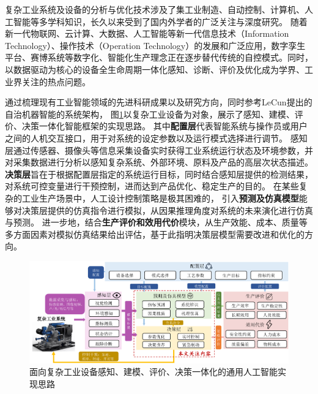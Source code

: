 

复杂工业系统及设备的分析与优化技术涉及了集工业制造、自动控制、计算机、人工智能等多学科知识，长久以来受到了国内外学者的广泛关注与深度研究。
随着新一代物联网、云计算、大数据、人工智能等新一代信息技术（Information Technology）、操作技术（Operation Technology）的发展和广泛应用，数字孪生平台、赛博系统等数字化、智能化生产理念正在逐步替代传统的自控模式。同时，以数据驱动为核心的设备全生命周期一体化感知、诊断、评价及优化成为学界、工业界关注的热点问题。

通过梳理现有工业智能领域的先进科研成果以及研究方向，同时参考LeCun提出的自治机器智能的系统架构\cite{lecun2022path}，
图\ref{fig:industrial_ai}以复杂工业设备为对象，展示了感知、建模、评价、决策一体化智能框架的实现思路。
其中\textbf{配置层}代表智能系统与操作员或用户之间的人机交互接口，用于对系统的设定参数以及运行模式选择进行调节。
感知层通过传感器、摄像头等信息采集设备实时获得工业系统运行状态及环境参数，并对采集数据进行分析以感知复杂系统、外部环境、原料及产品的高层次状态描述。
\textbf{决策层}旨在于根据配置层指定的系统运行目标，同时结合感知层提供的检测结果，对系统可控变量进行干预控制，进而达到产品优化、稳定生产的目的。
在某些复杂的工业生产场景中，人工设计控制策略是极其困难的，
引入\textbf{预测及仿真模型}能够对决策层提供的仿真指令进行模拟，从因果推理角度对系统的未来演化进行仿真与预测。
进一步地，结合\textbf{生产评价和效用代价}模块，从生产效能、成本、质量等多方面因素对模拟仿真结果给出评估，基于此指明决策层模型需要改进和优化的方向。

\begin{figure}
    \includegraphics[width=\linewidth]{figures/chapter1/industrial_ai.pdf}
    \caption{面向复杂工业设备感知、建模、评价、决策一体化的通用人工智能实现思路}
    \label{fig:industrial_ai}
\end{figure}

